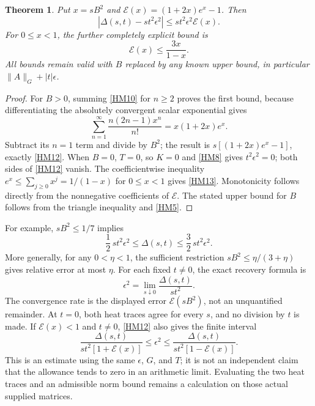 \documentclass[11pt]{article}
\newtheorem{theorem}{Theorem}
\begin{document}
\begin{theorem}
Put \(x=sB^2\) and \(\mathcal E(x)=(1+2x)e^x-1\). Then
\begin{equation}
 \left|\Delta(s,t)-s t^2\epsilon^2\right|
 \le s t^2\epsilon^2\mathcal E(x).
 \tag{HM12}\label{HM12}
\end{equation}
For \(0\le x<1\), the further completely explicit bound is
\begin{equation}
 \mathcal E(x)\le\frac{3x}{1-x}.
 \tag{HM13}\label{HM13}
\end{equation}
All bounds remain valid with \(B\) replaced by any known upper bound, in
particular \(\|A\|_G+|t|\epsilon\).
\end{theorem}
\begin{proof}
For \(B>0\), summing \eqref{HM10} for \(n\ge2\) proves the first bound,
because differentiating the absolutely convergent scalar exponential gives
\[
 \sum_{n=1}^{\infty}\frac{n(2n-1)x^n}{n!}
   =x(1+2x)e^x.
\]
Subtract its \(n=1\) term and divide by \(B^2\); the result is
\(s[(1+2x)e^x-1]\), exactly \eqref{HM12}.
When \(B=0\), \(T=0\), so \(K=0\) and \eqref{HM8} gives
\(t^2\epsilon^2=0\); both sides of \eqref{HM12} vanish.
The coefficientwise inequality \(e^x\le\sum_{j\ge0}x^j=1/(1-x)\)
for \(0\le x<1\) gives \eqref{HM13}. Monotonicity follows directly from
the nonnegative coefficients of \(\mathcal E\). The stated upper bound
for \(B\) follows from the triangle inequality and \eqref{HM5}.
\end{proof}

For example, \(sB^2\le1/7\) implies
\begin{equation}
 \frac12\,s t^2\epsilon^2\le\Delta(s,t)
       \le\frac32\,s t^2\epsilon^2.
 \tag{HM14}\label{HM14}
\end{equation}
More generally, for any \(0<\eta<1\), the sufficient restriction
\(sB^2\le\eta/(3+\eta)\) gives relative error at most \(\eta\).
For each fixed \(t\ne0\), the exact recovery formula is
\begin{equation}
 \epsilon^2=\lim_{s\downarrow0}\frac{\Delta(s,t)}{s t^2}.
 \tag{HM15}\label{HM15}
\end{equation}
The convergence rate is the displayed error \(\mathcal E(sB^2)\), not an
unquantified remainder. At \(t=0\), both heat traces agree for every \(s\),
and no division by \(t\) is made. If \(\mathcal E(x)<1\) and \(t\ne0\),
\eqref{HM12} also gives the finite interval
\begin{equation}
 \frac{\Delta(s,t)}{s t^2[1+\mathcal E(x)]}
 \le\epsilon^2\le
 \frac{\Delta(s,t)}{s t^2[1-\mathcal E(x)]}.
 \tag{HM16}\label{HM16}
\end{equation}
This is an estimate using the same \(\epsilon\), \(G\), and \(T\); it is
not an independent claim that the allowance tends to zero in an arithmetic
limit. Evaluating the two heat traces and an admissible norm bound remains
a calculation on those actual supplied matrices.
\end{document}
